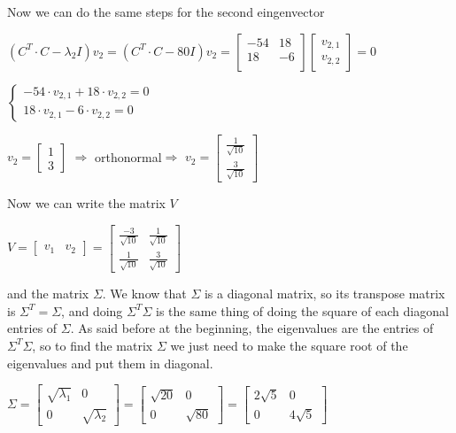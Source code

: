 Now we can do the same steps for the second eingenvector
\begin{center}
		$  (C^T \cdot C-\lambda_2 I)v_2=( C^T \cdot C-80 I) v_2= \begin{bmatrix}
		-54 &   18 \\
		18  &  -6\\
	\end{bmatrix}\begin{bmatrix}v_{2,1}\\v_{2,2}\end{bmatrix}=0  $
\end{center}
\begin{center}
	
	$ \begin{cases} -54\cdot v_{2,1}+18 \cdot v_{2,2}=0 \\
	18\cdot v_{2,1} -6 \cdot v_{2,2}=0 \end{cases} $
\end{center}
\begin{center}
	$  v_2=\begin{bmatrix}
	1\\
	3
	\end{bmatrix}$ $ \Longrightarrow $ orthonormal$ \Longrightarrow $ $v_2=\begin{bmatrix}
	\frac{1}{\sqrt{10}}\\
	\frac{3}{\sqrt{10}}
	\end{bmatrix}  $
\end{center}
Now we can write the matrix $ V $
\begin{center}
	$ V=\begin{bmatrix}
	v_1 & v_2
	\end{bmatrix}=\begin{bmatrix}
	\frac{-3}{\sqrt{10}} & \frac{1}{\sqrt{10}}\\
	\frac{1}{\sqrt{10}} &	\frac{3}{\sqrt{10}}
	\end{bmatrix} $
\end{center}
and the matrix $ \Sigma $. We know that  $ \Sigma $ is a diagonal matrix, so its transpose matrix is $ \Sigma^T= \Sigma  $, and doing $\Sigma^T \Sigma$ is the same thing of doing the square of each diagonal entries of $\Sigma$.
As said before at the beginning, the eigenvalues are the entries of $\Sigma^T \Sigma$, so to find the matrix $\Sigma$ we just need to make the square root of the eigenvalues and put them in diagonal.
\begin{center}
	$ \Sigma=\begin{bmatrix}
	\sqrt{\lambda_1} & 0\\
	0 & \sqrt{\lambda_2}
	\end{bmatrix}=\begin{bmatrix}
		\sqrt{20} & 0\\
		0 & \sqrt{80}
	\end{bmatrix}=\begin{bmatrix}
	2\sqrt{5} & 0\\
	0 & 4\sqrt{5}
	\end{bmatrix} $
\end{center}
